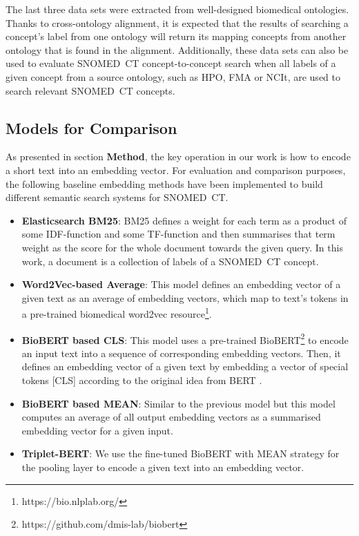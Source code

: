 \documentclass[preprint,12pt]{elsarticle}
\begin{document}
The last three data sets were extracted from well-designed biomedical ontologies. Thanks to cross-ontology alignment, it is expected that the results of searching a concept's label from one ontology will return its mapping concepts from another ontology that is found in the alignment. Additionally, these data sets can also be used to evaluate SNOMED~CT concept-to-concept search when all labels of a given concept from a source ontology, such as HPO, FMA or NCIt, are used to search relevant SNOMED~CT concepts.

\subsection*{Models for Comparison}
\label{sec:ModelComparison}

As presented in section \textbf{Method}, the key operation in our work is how to encode a short text into an embedding vector. For evaluation and comparison purposes, the following baseline embedding methods have been implemented to build different semantic search systems for SNOMED~CT.

\begin{itemize}[noitemsep,topsep=0pt,parsep=0pt,partopsep=0pt]
  \item \textbf{Elasticsearch BM25}: BM25 defines a weight for each term as a product of some IDF-function and some TF-function and then summarises that term weight as the score for the whole document towards the given query. In this work, a document is a collection of labels of a SNOMED~CT concept.
  \item \textbf{Word2Vec-based Average}: This model defines an embedding vector of a given text as an average of embedding vectors, which map to text's tokens in a pre-trained biomedical word2vec resource\footnote{https://bio.nlplab.org/}.
  \item \textbf{BioBERT based CLS}: This model uses a pre-trained BioBERT\footnote{https://github.com/dmis-lab/biobert} to encode an input text into a sequence of corresponding embedding vectors. Then, it defines an embedding vector of a given text by embedding a vector of special tokens [CLS] according to the original idea from BERT \cite{Devlin2019}.
  \item \textbf{BioBERT based MEAN}: Similar to the previous model but this model computes an average of all output embedding vectors as a summarised embedding vector for a given input.
  \item \textbf{Triplet-BERT}: We use the fine-tuned BioBERT with MEAN strategy for the pooling layer to encode a given text into an embedding vector.
\end{itemize}
\end{document}
